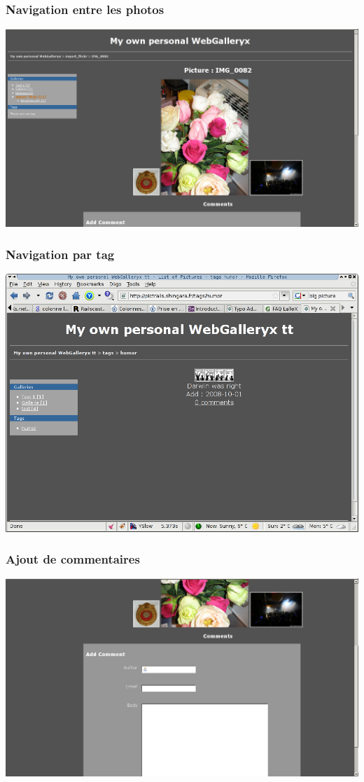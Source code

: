 \documentclass{beamer}
\begin{document}
\begin{frame}
    \frametitle{Navigation entre les photos}
    \begin{center}
    \includegraphics[scale=.3]{picture_view.png}
    \end{center}
\end{frame}

\begin{frame}
    \frametitle{Navigation par tag}
    \begin{center}
    \includegraphics[scale=.4]{tag_view.png}
    \end{center}
\end{frame}

\begin{frame}
    \frametitle{Ajout de commentaires}
    \begin{center}
    \includegraphics[scale=.3]{comment_view.png}
    \end{center}
\end{frame}
\end{document}

